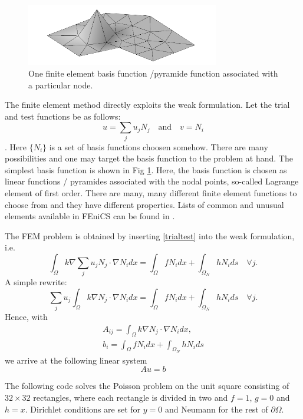 \begin{figure}
\begin{center}
\includegraphics[width=0.75\textwidth]{chapters/elliptic/pics/fem.png}
\caption{One finite element basis function /pyramide function associated with a particular node.}
\label{fig:fembasis}
\end{center}
\end{figure}




The finite element method directly exploits the weak formulation. 
Let the trial and test functions be as follows:  
\begin{equation}
\label{trialtest}
u = \sum_j u_j N_j \quad \text{and} \quad v=N_i
\end{equation}
	. Here $\{N_i\}$ is a set of basis functions choosen somehow. 
There are many possibilities and one may target the basis function to the problem at hand. 
The simplest basis function is shown in 
Fig \ref{fig:fembasis}. Here, the basis function is chosen as linear functions / pyramides associated with the nodal points, 
so-called Lagrange element of first order.  
There are many, many different finite element functions to choose from and they have different properties. 
Lists of common and unusual elements available in FEniCS can be found in 
\cite{logg2012automated}. 

The FEM problem is obtained by inserting \eqref{trialtest} into the weak formulation, i.e.   
\[
\int_\Omega k \nabla \sum_j u_j N_j  \cdot \nabla N_i dx = \int_\Omega f N_i dx + \int_{\Omega_N} h N_i ds  \quad \forall j .    
\]
A simple rewrite: 
\[
\sum_j u_j  \int_\Omega k \nabla  N_j  \cdot \nabla N_i dx = \int_\Omega f N_i dx + \int_{\Omega_N} h N_i ds \quad \forall j.    
\]
Hence, with  
\begin{eqnarray*}
A_{ij} = \int_\Omega k \nabla  N_j  \cdot \nabla N_i dx, \\  
b_i = \int_\Omega f N_i dx + \int_{\Omega_N} h N_i ds 
\end{eqnarray*}
we arrive at the following linear system 
\[
A u = b 
\]

The following code solves the Poisson problem on the unit square
consisting of $32\times 32$ rectangles, where each rectangle is divided
in two and $f=1$, $g=0$ and $h=x$. Dirichlet conditions are set 
for $y=0$ and Neumann for the rest of $\partial \Omega$.  

